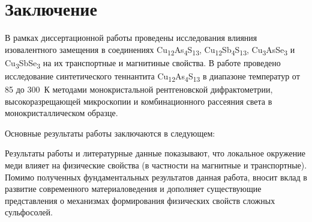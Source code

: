 \chapter*{Заключение}						%



В рамках диссертационной работы проведены исследования влияния изовалентного замещения в соединениях Cu\textsubscript{12}As\textsubscript{4}S\textsubscript{13}, Cu\textsubscript{12}Sb\textsubscript{4}S\textsubscript{13}, Cu\textsubscript{3}AsSe\textsubscript{3} и Cu\textsubscript{3}SbSe\textsubscript{3} на их транспортные и магнитиные свойства. 
В работе проведено исследование  синтетического теннантита Cu\textsubscript{12}As\textsubscript{4}S\textsubscript{13} в диапазоне температур от 85 до 300~К методами монокристальной рентгеновской дифрактометрии, высокоразрещающей микроскопии и комбинационного рассеяния света в монокристаллическом образце.

Основные результаты работы заключаются в следующем:


Результаты работы и литературные данные показывают, что локальное окружение меди влияет на физические свойства (в частности на магнитные и транспортные). Помимо полученных фундаментальных результатов данная работа, вносит вклад в развитие современного материаловедения и дополняет существующие представления о механизмах формирования физических свойств сложных сульфосолей.



